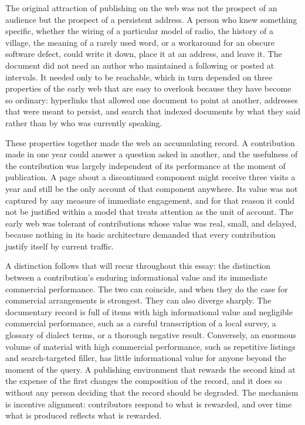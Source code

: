 \documentclass[11pt]{article}
\theoremstyle{remark}
\begin{document}
The original attraction of publishing on the web was not the prospect of an audience but the prospect of a persistent address. A person who knew something specific, whether the wiring of a particular model of radio, the history of a village, the meaning of a rarely used word, or a workaround for an obscure software defect, could write it down, place it at an address, and leave it. The document did not need an author who maintained a following or posted at intervals. It needed only to be reachable, which in turn depended on three properties of the early web that are easy to overlook because they have become so ordinary: hyperlinks that allowed one document to point at another, addresses that were meant to persist, and search that indexed documents by what they said rather than by who was currently speaking.

These properties together made the web an accumulating record. A contribution made in one year could answer a question asked in another, and the usefulness of the contribution was largely independent of its performance at the moment of publication. A page about a discontinued component might receive three visits a year and still be the only account of that component anywhere. Its value was not captured by any measure of immediate engagement, and for that reason it could not be justified within a model that treats attention as the unit of account. The early web was tolerant of contributions whose value was real, small, and delayed, because nothing in its basic architecture demanded that every contribution justify itself by current traffic.

A distinction follows that will recur throughout this essay: the distinction between a contribution's enduring informational value and its immediate commercial performance. The two can coincide, and when they do the case for commercial arrangements is strongest. They can also diverge sharply. The documentary record is full of items with high informational value and negligible commercial performance, such as a careful transcription of a local survey, a glossary of dialect terms, or a thorough negative result. Conversely, an enormous volume of material with high commercial performance, such as repetitive listings and search-targeted filler, has little informational value for anyone beyond the moment of the query. A publishing environment that rewards the second kind at the expense of the first changes the composition of the record, and it does so without any person deciding that the record should be degraded. The mechanism is incentive alignment: contributors respond to what is rewarded, and over time what is produced reflects what is rewarded.
\end{document}
